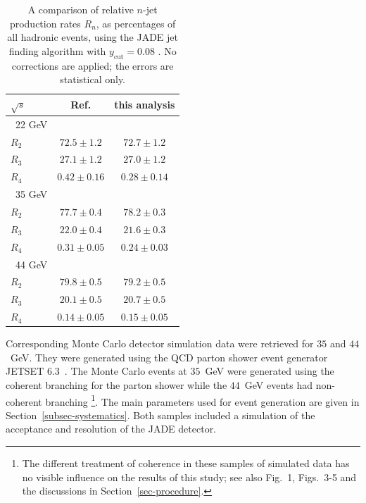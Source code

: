 \documentclass[12pt,a4paper,twoside]{article}
\newcommand{\ycut}   {\ensuremath{y_{\mathrm{cut}}}}
\begin{document}
\begin{table}[t]
\begin{center}
\begin{tabular}{|l|c|c|}
\hline
$\sqrt{s}$ & Ref. \cite{bib-JADEeventsel} & this analysis \\ 
\hline\hline
\ 22 GeV & & \\
{\hfill $R_2$} & $ 72.5 \pm 1.2$ & $ 72.7 \pm 1.2$ \\
{\hfill $R_3$} & $ 27.1 \pm 1.2$ & $ 27.0 \pm 1.2$ \\
{\hfill $R_4$} & $ 0.42 \pm 0.16$ & $ 0.28 \pm 0.14$ \\ \hline
\ 35 GeV & & \\
{\hfill $R_2$} & $ 77.7 \pm 0.4$ & $ 78.2 \pm 0.3$ \\
{\hfill $R_3$} & $ 22.0 \pm 0.4$ & $ 21.6 \pm 0.3$ \\
{\hfill $R_4$} & $ 0.31 \pm 0.05$ & $ 0.24 \pm 0.03$ \\ \hline
\ 44 GeV & & \\
{\hfill $R_2$} & $ 79.8 \pm 0.5$ & $ 79.2 \pm 0.5$ \\
{\hfill $R_3$} & $ 20.1 \pm 0.5$ & $ 20.7 \pm 0.5$ \\
{\hfill $R_4$} & $ 0.14 \pm 0.05$ & $ 0.15 \pm 0.05$ \\
\hline
\end{tabular}
\end{center}
\caption{\label{tab-oldjetrates}
A comparison of relative $n$-jet production
rates $R_n$, as
percentages of all hadronic events, using the JADE jet finding
algorithm with $\ycut = 0.08$ \protect\cite{bib-JADEeventsel}.
No corrections are applied; the errors are statistical only.
}
\end{table}
 
Corresponding Monte Carlo detector simulation data were 
retrieved for $35$ and $44$~GeV.
They were generated using the QCD parton shower event generator
JETSET 6.3~\cite{bib-JETSET}.
The Monte Carlo events at 
$35$~GeV were generated using the coherent branching for the parton 
shower while the $44$~GeV events had non-coherent branching
\footnote{The different treatment of coherence in these samples of
simulated data has no visible influence on the results of this study; see
also Fig.~1, Figs.~3-5 and the discussions in Section~\ref{sec-procedure}.}.
The main parameters used for event
generation are given in Section~\ref{subsec-systematics}.
Both samples included a simulation of the acceptance and resolution
of the JADE detector.
\end{document}
